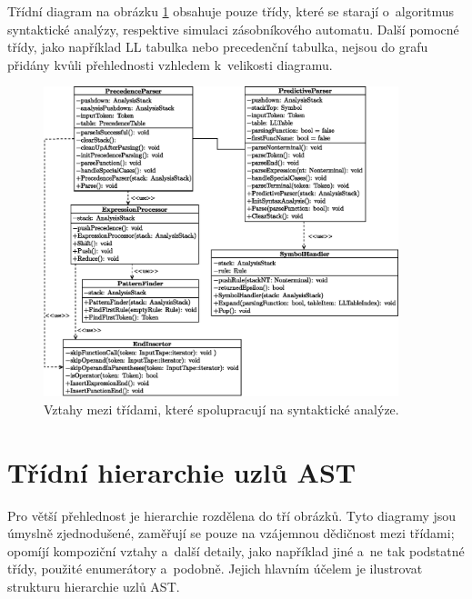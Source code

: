 Třídní diagram na obrázku \ref{fig_parsers_class_diagram} obsahuje pouze třídy, které se starají o~algoritmus syntaktické analýzy, respektive simulaci zásobníkového automatu.
Další pomocné třídy, jako například LL tabulka nebo precedenční tabulka, nejsou do grafu přidány kvůli přehlednosti vzhledem k~velikosti diagramu.
\begin{figure}[ht]
    \centering
    \includegraphics[width=0.92\textwidth]{obrazky-figures/parsers_class_diagram.eps}
    \caption{Vztahy mezi třídami, které spolupracují na syntaktické analýze.}
    \label{fig_parsers_class_diagram}
\end{figure}

\chapter{Třídní hierarchie uzlů AST} \label{kap_priloha_c}
Pro větší přehlednost je hierarchie rozdělena do tří obrázků.
Tyto diagramy jsou úmyslně zjednodušené, zaměřují se pouze na vzájemnou dědičnost mezi třídami; opomíjí kompoziční vztahy a~další detaily, jako například jiné a~ne tak podstatné třídy, použité enumerátory a~podobně.
Jejich hlavním účelem je ilustrovat strukturu hierarchie uzlů AST.


